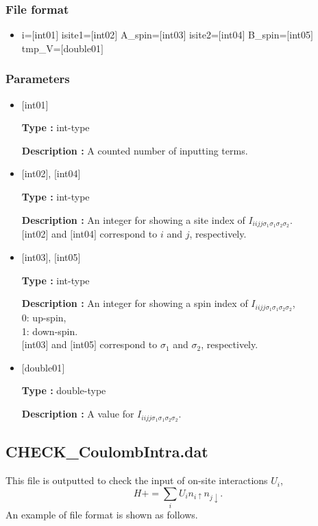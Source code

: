 \subsubsection{File format}
 \begin{itemize}
   \item  i=$[$int01$]$ isite1=$[$int02$]$  A\_spin=$[$int03$]$ isite2=$[$int04$]$  B\_spin=$[$int05$]$ tmp\_V=$[$double01$]$ 
 \end{itemize}
 
\subsubsection{Parameters}
 \begin{itemize}

    \item  $[$int01$]$ 
   
    {\bf Type :} int-type

   {\bf Description :} A counted number of inputting terms.
   
   \item  $[$int02$]$, $[$int04$]$
   
    {\bf Type :} int-type

    {\bf Description :}   An integer for showing a site index of  $I_{iijj\sigma_1\sigma_1\sigma_2\sigma_2}$. \\
    $[$int02$]$ and $[$int04$]$ correspond to $i$ and $j$, respectively.
 
   \item  $[$int03$]$, $[$int05$]$  
   
    {\bf Type :} int-type

   {\bf Description :}  An integer for showing a spin index of $I_{iijj\sigma_1\sigma_1\sigma_2\sigma_2}$,\\
   0: up-spin,\\
   1: down-spin.\\
   $[$int03$]$ and $[$int05$]$ correspond to  $\sigma_1$ and $\sigma_2$, respectively.\\
 
   \item  $[$double01$]$ 
   
    {\bf Type :} double-type

   {\bf Description :} A value for $I_{iijj\sigma_1\sigma_1\sigma_2\sigma_2}$.
  
\end{itemize}

\newpage
\subsection{CHECK\_CoulombIntra.dat}
This file is outputted to check the input of on-site interactions $U_i$,
\begin{equation}
H+=\sum_{i} U_i n_{i\uparrow} n_{j \downarrow}.
\end{equation}
An example of file format is shown as follows.

